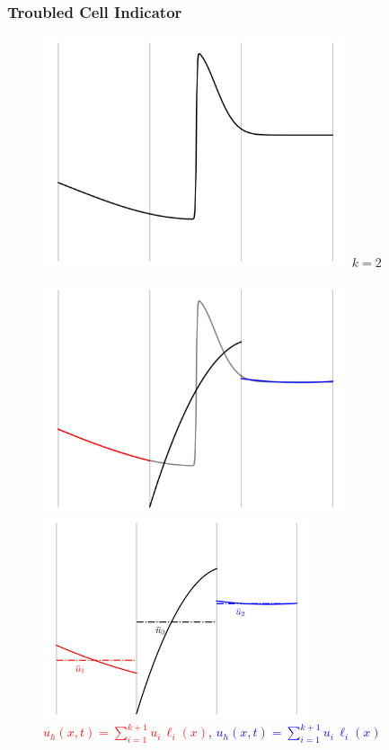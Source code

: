 \documentclass{beamer}
\begin{document}
\begin{frame}
\frametitle{Troubled Cell Indicator \citep{fs2017}}

  \begin{figure}
    \begin{overprint}
        \centering\includegraphics[width=0.8\textwidth]{./fig.tci_00.png}
        $k = 2$

        \centering\includegraphics[width=0.8\textwidth]{./fig.tci_01.png}
        \centering\includegraphics[width=0.7\textwidth]{./fig.tci_02.png}
        \textcolor{red}{$u_{h}\left(x,t\right)
        = \sum\limits_{i=1}^{k+1} u_{i} \, \ell_{i}\left(x\right)$},
        \textcolor{blue}{$u_{h}\left(x,t\right)
        = \sum\limits_{i=1}^{k+1} u_{i} \, \ell_{i}\left(x\right)$}


\end{overprint}
\end{figure}
\end{frame}
\end{document}
